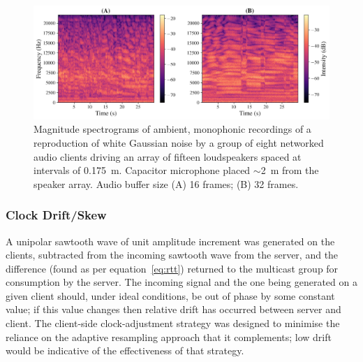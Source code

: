 \begin{figure}[h]
    \centering
    \includegraphics[width=\textwidth]{figures/wgn_specgram_16_32}
    \caption{
        Magnitude spectrograms of ambient, monophonic recordings of a
        reproduction of white Gaussian noise by a group of eight networked
        audio clients driving an array of fifteen loudspeakers spaced at
        intervals of \qty{.175}{\m}.
        Capacitor microphone placed $\sim$\qty{2}{\m} from the
        speaker array.
        Audio buffer size (A) 16 frames; (B) 32 frames.
    }
    \label{fig:spectrograms}
\end{figure}

\subsubsection{Clock Drift/Skew}
A unipolar sawtooth wave of unit amplitude increment was generated on the
clients, subtracted from the incoming sawtooth wave from the server, and the
difference (found as per equation~\eqref{eq:rtt}) returned to the multicast
group for consumption by the server.
The incoming signal and the one being generated on a given client should, under
ideal conditions, be out of phase by some constant value;
if this value changes then relative drift has occurred between server and
client.
The client-side clock-adjustment strategy was designed to minimise the reliance
on the adaptive resampling approach that it complements;
low drift would be indicative of the effectiveness of that strategy.


